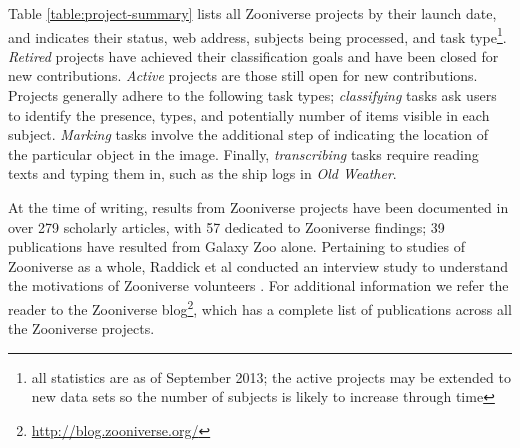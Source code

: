 \documentclass{sigchi}
\begin{document}

Table \ref{table:project-summary} lists all Zooniverse projects by their launch date, and indicates their status, web address, subjects being processed, and task type\footnote{all statistics are as of September 2013; the active projects may be extended to new data sets so the number of subjects is likely to increase through time}. \emph{Retired} projects have achieved their classification goals and have been closed for new contributions. \emph{Active} projects are those still open for new contributions.  Projects generally adhere to the following task types; \emph{classifying} tasks ask users to identify the presence, types, and potentially number of items visible in each subject.  \emph{Marking} tasks involve the additional step of indicating the location of the particular object in the image.  Finally, \emph{transcribing} tasks require reading texts and typing them in, such as the ship logs in \emph{Old Weather}. 

At the time of writing, results from Zooniverse projects have been documented in over 279 scholarly articles, with 57  dedicated to Zooniverse findings; 39 publications have resulted from Galaxy Zoo alone.  Pertaining to studies of Zooniverse as a whole, Raddick et al conducted an interview study to understand the motivations of Zooniverse volunteers \cite{raddick2010galaxy}. For additional information we refer the reader to the Zooniverse blog\footnote{\url{http://blog.zooniverse.org/}}, which has a complete list of publications across all the Zooniverse projects.
\end{document}
